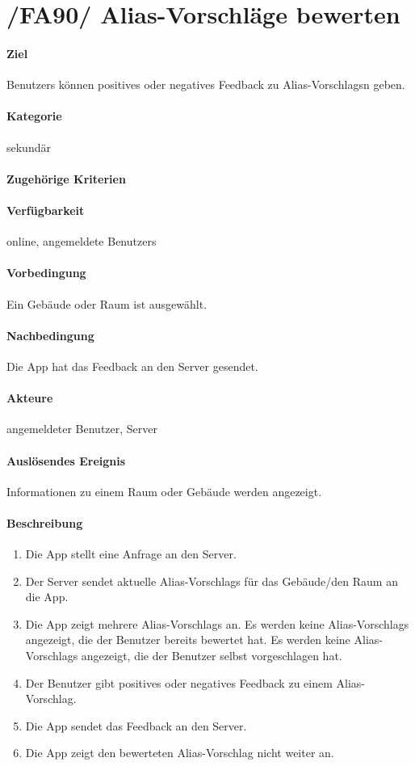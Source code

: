 \section[Alias-Vorschläge bewerten]{/FA90/ Alias-Vorschläge bewerten}
\label{/FA90/}
\paragraph{Ziel}
\Glspl{Benutzer} können positives oder negatives Feedback zu \Glspl{Alias-Vorschlag}n geben.
\paragraph{Kategorie}
sekundär
\paragraph{Zugehörige Kriterien}

\paragraph{Verfügbarkeit}
online, angemeldete \Glspl{Benutzer}
\paragraph{Vorbedingung}
Ein Gebäude oder Raum ist ausgewählt.
\paragraph{Nachbedingung}
Die App hat das Feedback an den \Gls{Server} gesendet.
\paragraph{Akteure}
angemeldeter \Gls{Benutzer}, \Gls{Server}
\paragraph{Auslösendes Ereignis}
Informationen zu einem Raum oder Gebäude werden angezeigt.
\paragraph{Beschreibung}
\begin{enumerate}
    \item Die App stellt eine Anfrage an den \Gls{Server}.
    \item Der \Gls{Server} sendet aktuelle \Glspl{Alias-Vorschlag} für das Gebäude/den Raum an die App.
    \item Die App zeigt mehrere \Glspl{Alias-Vorschlag} an. Es werden keine \Glspl{Alias-Vorschlag} angezeigt, die der \Gls{Benutzer} bereits bewertet hat. Es werden keine \Glspl{Alias-Vorschlag} angezeigt, die der \Gls{Benutzer} selbst vorgeschlagen hat.
    \item Der \Gls{Benutzer} gibt positives oder negatives Feedback zu einem \Gls{Alias-Vorschlag}.
    \item Die App sendet das Feedback an den \Gls{Server}.
    \item Die App zeigt den bewerteten \Gls{Alias-Vorschlag} nicht weiter an.
\end{enumerate}